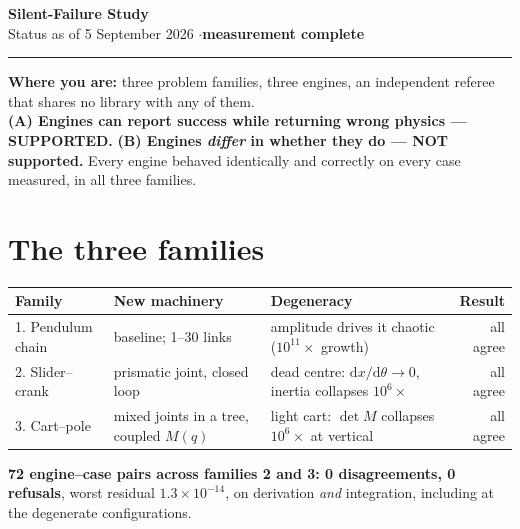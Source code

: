 \documentclass[10pt,a4paper]{article}
\begin{document}
\small

{\LARGE\bfseries Silent-Failure Study}\\[0.3em]
{\large Status as of 5 September 2026 \quad$\cdot$\quad \textbf{measurement complete}}\\[0.2em]
{\color{rulegrey}\hrule height 1pt}

\vspace{0.55em}

{\large\bfseries Where you are:} three problem families, three engines, an
independent referee that shares no library with any of them.\\[0.3em]
\textbf{(A) Engines can report success while returning wrong physics ---
\textcolor{okgreen}{SUPPORTED}.}
\textbf{(B) Engines \emph{differ} in whether they do ---
\textcolor{holdred}{NOT supported}.} Every engine behaved identically and
correctly on every case measured, in all three families.

\vspace{0.4em}

\section{The three families}

\begin{tabular}{@{}lL{0.30\textwidth}L{0.30\textwidth}r@{}}
\toprule
\textbf{Family} & \textbf{New machinery} & \textbf{Degeneracy} & \textbf{Result} \\
. Pendulum chain & baseline; 1--30 links & amplitude drives it chaotic ($10^{11}\times$ growth) & all agree \\
2. Slider--crank & prismatic joint, closed loop & dead centre: $\mathrm{d}x/\mathrm{d}\theta\to0$, inertia collapses $10^6\times$ & all agree \\
3. Cart--pole & mixed joints in a tree, coupled $M(q)$ & light cart: $\det M$ collapses $10^6\times$ at vertical & all agree \\
\bottomrule
\end{tabular}

\vspace{0.35em}
\textbf{72 engine--case pairs across families 2 and 3: 0 disagreements, 0
refusals}, worst residual $1.3\times10^{-14}$, on derivation \emph{and}
integration, including at the degenerate configurations.

\end{document}
